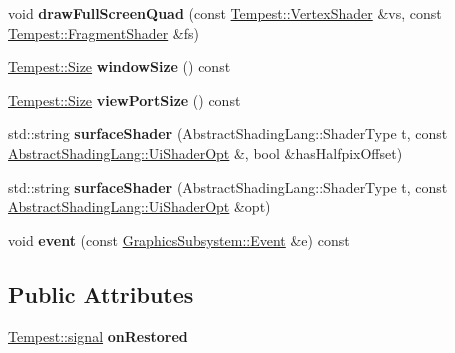 \begin{DoxyCompactItemize}
\item 
\hypertarget{class_tempest_1_1_device_a2a2568ad226527a82062ef159f9a01f2}{void {\bfseries draw\+Full\+Screen\+Quad} (const \hyperlink{class_tempest_1_1_vertex_shader}{Tempest\+::\+Vertex\+Shader} \&vs, const \hyperlink{class_tempest_1_1_fragment_shader}{Tempest\+::\+Fragment\+Shader} \&fs)}\label{class_tempest_1_1_device_a2a2568ad226527a82062ef159f9a01f2}

\item 
\hypertarget{class_tempest_1_1_device_a7cf66558d20b7e25cf8ed597b47474fe}{\hyperlink{struct_tempest_1_1_size}{Tempest\+::\+Size} {\bfseries window\+Size} () const }\label{class_tempest_1_1_device_a7cf66558d20b7e25cf8ed597b47474fe}

\item 
\hypertarget{class_tempest_1_1_device_a6ef303b1b3662f847aedcc29de66b867}{\hyperlink{struct_tempest_1_1_size}{Tempest\+::\+Size} {\bfseries view\+Port\+Size} () const }\label{class_tempest_1_1_device_a6ef303b1b3662f847aedcc29de66b867}

\item 
\hypertarget{class_tempest_1_1_device_a111eed95893ad2c09407f2c8b5e57a8e}{std\+::string {\bfseries surface\+Shader} (Abstract\+Shading\+Lang\+::\+Shader\+Type t, const \hyperlink{struct_tempest_1_1_abstract_shading_lang_1_1_ui_shader_opt}{Abstract\+Shading\+Lang\+::\+Ui\+Shader\+Opt} \&, bool \&has\+Halfpix\+Offset)}\label{class_tempest_1_1_device_a111eed95893ad2c09407f2c8b5e57a8e}

\item 
\hypertarget{class_tempest_1_1_device_a1ab2abb331504ba3633905c606b55bcf}{std\+::string {\bfseries surface\+Shader} (Abstract\+Shading\+Lang\+::\+Shader\+Type t, const \hyperlink{struct_tempest_1_1_abstract_shading_lang_1_1_ui_shader_opt}{Abstract\+Shading\+Lang\+::\+Ui\+Shader\+Opt} \&opt)}\label{class_tempest_1_1_device_a1ab2abb331504ba3633905c606b55bcf}

\item 
\hypertarget{class_tempest_1_1_device_a7950ec8c646b4bd91d288109f9bce0fb}{void {\bfseries event} (const \hyperlink{struct_tempest_1_1_graphics_subsystem_1_1_event}{Graphics\+Subsystem\+::\+Event} \&e) const }\label{class_tempest_1_1_device_a7950ec8c646b4bd91d288109f9bce0fb}

\end{DoxyCompactItemize}
\subsection*{Public Attributes}
\begin{DoxyCompactItemize}
\item 
\hypertarget{class_tempest_1_1_device_a779fe4edbf6a41d6f43ce25089519e1c}{\hyperlink{class_tempest_1_1signal}{Tempest\+::signal} {\bfseries on\+Restored}}\label{class_tempest_1_1_device_a779fe4edbf6a41d6f43ce25089519e1c}

\end{DoxyCompactItemize}
